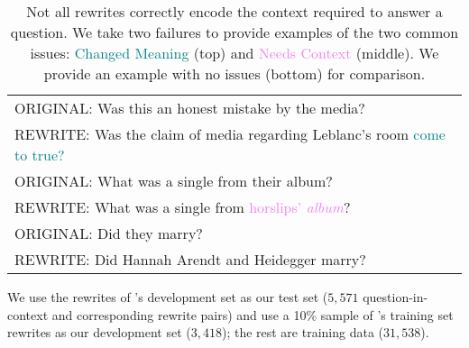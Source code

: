 \begin{table}[t]
 	\centering
    \begin{tabular}{l}
          \rowcolor{white}
		ORIGINAL: Was this an honest mistake by the media? \\
        \rowcolor{gray!25}
        REWRITE: Was the claim of media regarding Leblanc's room \textcolor{teal}{come to true?}\\
		\rowcolor{white}
		ORIGINAL: What was a single from their album? \\ 
		 \rowcolor{gray!25}
		 REWRITE: What was a single from \textcolor{violet}{horslips' \textit{album}}?  \\
          \rowcolor{white}
          ORIGINAL: Did they marry?  \\
	           \rowcolor{gray!25}
           REWRITE:   Did Hannah Arendt and Heidegger marry? \\
	\end{tabular}
        \caption{Not all rewrites correctly encode the context
          required to answer a question.  We take two failures to
          provide examples of the two common issues:
          \textcolor{teal}{Changed Meaning} (top) and
          \textcolor{violet}{Needs Context} (middle).  We provide an
          example with no issues (bottom) for comparison. }
	\label{tab:rewriteexamples}
\end{table}

We use the rewrites of \abr{\quac}'s development set as our test set
($5{,}571$ question-in-context and corresponding rewrite pairs) and use
a 10\% sample of \abr{\quac}'s training set rewrites as our
development set ($3{,}418$); the rest are training data ($31{,}538$).

